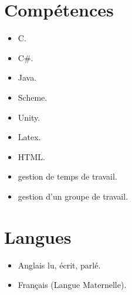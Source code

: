 \documentclass[a4paper]{article}
\begin{document}
    \section*{Compétences}
    
        \begin{itemize}
        
            \item C.
            \item C#.
            \item Java.
            \item Scheme.
            \item Unity.
            \item Latex.
            \item HTML.
            \item gestion de temps de travail.
            \item gestion d'un groupe de travail.

        \end{itemize}
    
    \section*{Langues}
    
        \begin{itemize}
            \item Anglais lu, écrit, parlé.
            \item Français (Langue Maternelle).
        \end{itemize}
\end{document}
